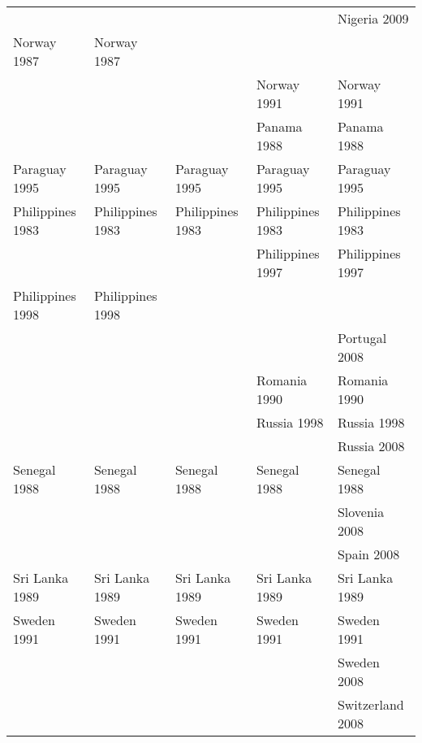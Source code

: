 \begin{table}[ht]
{\begin{tabular}{lllll}
   &  &  &  & Nigeria 2009\cellcolor[gray]{0.5} \\ 
  Norway 1987\cellcolor[gray]{0.5} & Norway 1987\cellcolor[gray]{0.5} &  &  &  \\ 
   &  &  & Norway 1991\cellcolor[gray]{0.5} & Norway 1991\cellcolor[gray]{0.5} \\ 
   &  &  & Panama 1988\cellcolor[gray]{0.5} & Panama 1988\cellcolor[gray]{0.5} \\ 
  Paraguay 1995\cellcolor[gray]{0.5} & Paraguay 1995\cellcolor[gray]{0.5} & Paraguay 1995\cellcolor[gray]{0.5} & Paraguay 1995\cellcolor[gray]{0.5} & Paraguay 1995\cellcolor[gray]{0.5} \\ 
  Philippines 1983\cellcolor[gray]{1} & Philippines 1983\cellcolor[gray]{1} & Philippines 1983\cellcolor[gray]{1} & Philippines 1983\cellcolor[gray]{1} & Philippines 1983\cellcolor[gray]{1} \\ 
   &  &  & Philippines 1997\cellcolor[gray]{0.5} & Philippines 1997\cellcolor[gray]{0.5} \\ 
  Philippines 1998\cellcolor[gray]{0.5} & Philippines 1998\cellcolor[gray]{0.5} &  &  &  \\ 
   &  &  &  & Portugal 2008\cellcolor[gray]{0.5} \\ 
   &  &  & Romania 1990\cellcolor[gray]{0.75} & Romania 1990\cellcolor[gray]{0.75} \\ 
   &  &  & Russia 1998\cellcolor[gray]{0.5} & Russia 1998\cellcolor[gray]{0.5} \\ 
   &  &  &  & Russia 2008\cellcolor[gray]{0.5} \\ 
  Senegal 1988\cellcolor[gray]{0.5} & Senegal 1988\cellcolor[gray]{0.5} & Senegal 1988\cellcolor[gray]{0.5} & Senegal 1988\cellcolor[gray]{0.5} & Senegal 1988\cellcolor[gray]{0.5} \\ 
   &  &  &  & Slovenia 2008\cellcolor[gray]{0.5} \\ 
   &  &  &  & Spain 2008\cellcolor[gray]{0.5} \\ 
  Sri Lanka 1989\cellcolor[gray]{0.5} & Sri Lanka 1989\cellcolor[gray]{0.5} & Sri Lanka 1989\cellcolor[gray]{0.5} & Sri Lanka 1989\cellcolor[gray]{0.5} & Sri Lanka 1989\cellcolor[gray]{0.5} \\ 
  Sweden 1991\cellcolor[gray]{0.5} & Sweden 1991\cellcolor[gray]{0.5} & Sweden 1991\cellcolor[gray]{0.5} & Sweden 1991\cellcolor[gray]{0.5} & Sweden 1991\cellcolor[gray]{0.5} \\ 
   &  &  &  & Sweden 2008\cellcolor[gray]{0.5} \\ 
   &  &  &  & Switzerland 2008\cellcolor[gray]{0.5} \\ 

\end{tabular}}
\end{table}
